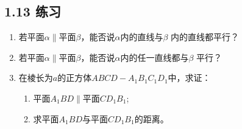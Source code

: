 \subsection*{1.13 练习}
\begin{enumerate}
\item 若平面$\alpha\parallel$平面$\beta$，能否说$\alpha$内的直线与$\beta$ 内的直线都平行？
\item 若平面$\alpha\parallel$平面$\beta$，能否说$\alpha$内的任一直线都与$\beta$ 平行？
\item 在棱长为$a$的正方体$ABCD-A_1B_1C_1D_1$中，求证：
\begin{enumerate}[(1)]
\item 平面$A_1BD\parallel$平面$CD_1B_1$;
\item 求平面$A_1BD$与平面$CD_1B_1$的距离。
\end{enumerate}

\end{enumerate}


